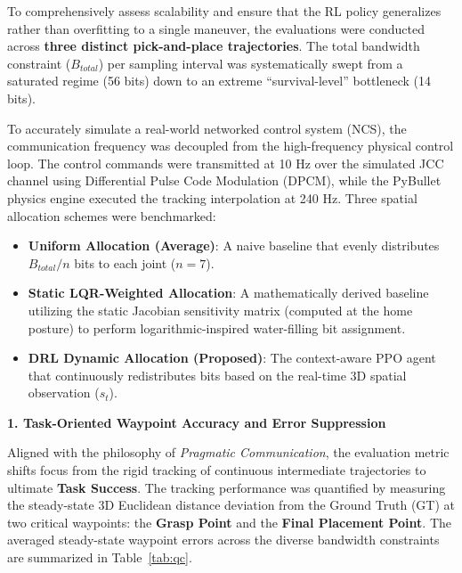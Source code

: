 To comprehensively assess scalability and ensure that the RL policy generalizes rather than overfitting to a single maneuver, the evaluations were conducted across \textbf{three distinct pick-and-place trajectories}. The total bandwidth constraint ($B_{total}$) per sampling interval was systematically swept from a saturated regime (56 bits) down to an extreme ``survival-level'' bottleneck (14 bits).

To accurately simulate a real-world networked control system (NCS), the communication frequency was decoupled from the high-frequency 
physical control loop. The control commands were transmitted at 10 Hz over the simulated JCC channel using Differential Pulse Code Modulation (DPCM), while the PyBullet physics engine executed the tracking interpolation at 240 Hz. Three spatial allocation schemes were benchmarked:
\begin{itemize}
    \item \textbf{Uniform Allocation (Average)}: A naive baseline that evenly distributes $B_{total}/n$ bits to each joint ($n=7$).
    \item \textbf{Static LQR-Weighted Allocation}: A mathematically derived baseline utilizing the static Jacobian sensitivity matrix (computed at the home posture) to perform logarithmic-inspired water-filling bit assignment.
    \item \textbf{DRL Dynamic Allocation (Proposed)}: The context-aware PPO agent that continuously redistributes bits based on the real-time 3D spatial observation ($s_t$).
\end{itemize}
\noindent\textbf{1. Task-Oriented Waypoint Accuracy and Error Suppression}

Aligned with the philosophy of \textit{Pragmatic Communication}, the evaluation metric shifts focus from the rigid tracking of continuous intermediate 
trajectories to ultimate \textbf{Task Success}. The tracking performance was quantified by measuring the steady-state 3D Euclidean distance 
deviation from the Ground Truth (GT) at two critical waypoints: the \textbf{Grasp Point} and the \textbf{Final Placement Point}. The averaged steady-state 
waypoint errors across the diverse bandwidth constraints are summarized in Table~\ref{tab:qc}.

